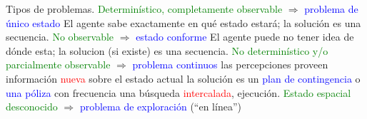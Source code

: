 \begin{frame}{Tipos de problemas.}
\textcolor{green}{Determinístico, completamente observable} $\Rightarrow$ \textcolor{blue}{problema de único estado} \newline
\blank{1cm}El agente sabe exactamente en qué estado estará; la solución es una secuencia.
\newline
\textcolor{green}{No observable} $\Rightarrow$ \textcolor{blue}{estado conforme} \newline
\blank{1cm}El agente puede no tener idea de dónde esta; la solucion (si existe) es una secuencia.
\newline
\textcolor{green}{No determinístico y/o parcialmente observable} $\Rightarrow$ \textcolor{blue}{problema continuos} \newline
\blank{1cm}las percepciones proveen información \textcolor{red}{nueva} sobre el estado actual\newline
\blank{1cm}la solución es un \textcolor{blue}{plan de contingencia} o \textcolor{blue}{una póliza}\newline
\blank{1cm}con frecuencia una búsqueda \textcolor{red}{intercalada}, ejecución.\newlin
\newline
\textcolor{green}{Estado espacial desconocido} $\Rightarrow$ \textcolor{blue}{problema de exploración} (“en línea”)
\end{frame}
